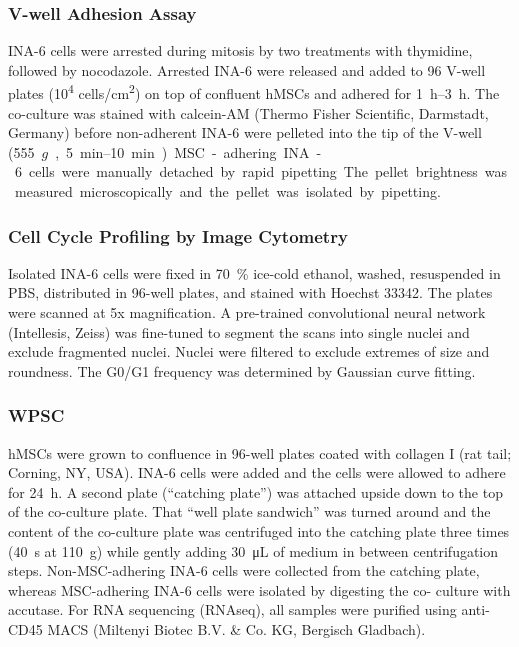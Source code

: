 \subsubsection*{V-well Adhesion Assay}%
\label{C1:methods_vwell}%
INA-6 cells were arrested during mitosis by two treatments with thymidine,
followed by nocodazole. Arrested INA-6 were released and added to 96 V-well
plates (10\textsuperscript{4} cells/cm\textsuperscript{2}) on top of confluent
hMSCs and adhered for \SIrange{1}{3}{\hour}. The co-culture was stained with
calcein-AM (Thermo Fisher Scientific, Darmstadt, Germany) before non-adherent
INA-6 were pelleted into the tip of the V-well (\SI{555}{$g$},
\SIrange{5}{10}{\minute}). MSC-adhering INA-6 cells were manually detached by
rapid pipetting. The pellet brightness was measured microscopically and the
pellet was isolated by pipetting.


\subsubsection*{Cell Cycle Profiling by Image Cytometry}%
\label{C1:methods_cellcycle}%
Isolated INA-6 cells were fixed in \SI{70}{\percent} ice-cold ethanol, washed, resuspended in PBS,
distributed in 96-well plates, and stained with Hoechst 33342. The plates were scanned at 5x
magnification. A pre-trained convolutional neural network (Intellesis, Zeiss) was fine-tuned to
segment the scans into single nuclei and exclude fragmented nuclei. Nuclei were filtered to
exclude extremes of size and roundness. The G0/G1 frequency was determined by Gaussian
curve fitting.


\subsubsection*{\ac{WPSC}}%
\label{C1:methods_wpsc}%
hMSCs were grown to confluence in 96-well plates coated with collagen I (rat
tail; Corning, NY, USA). INA-6 cells were added and the cells were allowed to
adhere for \SI{24}{\hour}. A second plate (``catching plate'') was attached
upside down to the top of the co-culture plate. That ``well plate sandwich'' was
turned around and the content of the co-culture plate was centrifuged into the
catching plate three times (\SI{40}{\second} at \SI{110}{g}) while gently adding
\SI{30}{\micro\liter} of medium in between centrifugation steps.
Non-MSC-adhering INA-6 cells were collected from the catching plate, whereas
MSC-adhering INA-6 cells were isolated by digesting the co- culture with
accutase. For RNA sequencing (RNAseq), all samples were purified using anti-CD45
\ac{MACS} (Miltenyi Biotec B.V. \& Co. KG, Bergisch
Gladbach).


